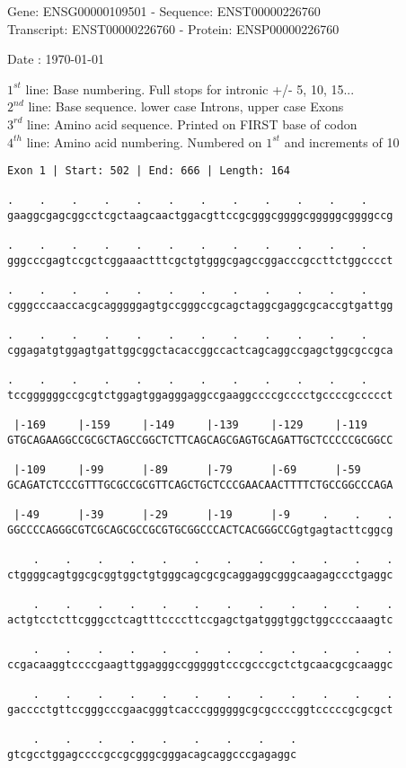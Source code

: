 \documentclass{article}
\begin{document}
\begin{center}
\begin{large}
Gene: ENSG00000109501 - Sequence: ENST00000226760\\
Transcript: ENST00000226760 - Protein: ENSP00000226760
 
 Date : \today
\end{large}
\end{center}
$1^{st}$ line: Base numbering. Full stops for intronic +/- 5, 10, 15...\\
$2^{nd}$ line: Base sequence. lower case Introns, upper case Exons\\
$3^{rd}$ line: Amino acid sequence. Printed on FIRST base of codon\\
$4^{th}$ line: Amino acid numbering. Numbered on $1^{st}$ and increments of 10\\
\begin{Verbatim}
Exon 1 | Start: 502 | End: 666 | Length: 164
 
.    .    .    .    .    .    .    .    .    .    .    .    
gaaggcgagcggcctcgctaagcaactggacgttccgcgggcggggcgggggcggggccg
  
.    .    .    .    .    .    .    .    .    .    .    .    
gggcccgagtccgctcggaaactttcgctgtgggcgagccggacccgccttctggcccct
  
.    .    .    .    .    .    .    .    .    .    .    .    
cgggcccaaccacgcagggggagtgccgggccgcagctaggcgaggcgcaccgtgattgg
  
.    .    .    .    .    .    .    .    .    .    .    .    
cggagatgtggagtgattggcggctacaccggccactcagcaggccgagctggcgccgca
  
.    .    .    .    .    .    .    .    .    .    .    .    
tccggggggccgcgtctggagtggagggaggccgaaggccccgcccctgccccgccccct
  
 |-169     |-159     |-149     |-139     |-129     |-119    
GTGCAGAAGGCCGCGCTAGCCGGCTCTTCAGCAGCGAGTGCAGATTGCTCCCCCGCGGCC
  
 |-109     |-99      |-89      |-79      |-69      |-59     
GCAGATCTCCCGTTTGCGCCGCGTTCAGCTGCTCCCGAACAACTTTTCTGCCGGCCCAGA
  
 |-49      |-39      |-29      |-19      |-9     .    .    .
GGCCCCAGGGCGTCGCAGCGCCGCGTGCGGCCCACTCACGGGCCGgtgagtacttcggcg
  
    .    .    .    .    .    .    .    .    .    .    .    .
ctggggcagtggcgcggtggctgtgggcagcgcgcaggaggcgggcaagagccctgaggc
  
    .    .    .    .    .    .    .    .    .    .    .    .
actgtcctcttcgggcctcagtttccccttccgagctgatgggtggctggccccaaagtc
  
    .    .    .    .    .    .    .    .    .    .    .    .
ccgacaaggtccccgaagttggagggccgggggtcccgcccgctctgcaacgcgcaaggc
  
    .    .    .    .    .    .    .    .    .    .    .    .
gacccctgttccgggcccgaacgggtcacccggggggcgcgccccggtcccccgcgcgct
  
    .    .    .    .    .    .    .    .    .
gtcgcctggagccccgccgcgggcgggacagcaggcccgagaggc
\end{Verbatim}
\end{document}
